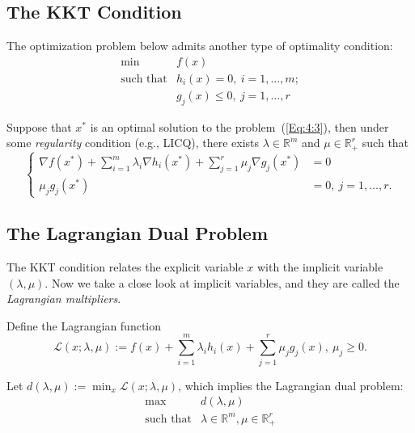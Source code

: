\subsection{The KKT Condition}
The optimization problem below admits another type of optimality condition:
\begin{equation}\label{Eq:4:3}
\begin{array}{ll}
\min&f(x)\\
\mbox{such that}&h_i(x) = 0,\ i=1,\dots,m;\\
&g_j(x) \le0,\ j=1,\dots,r
\end{array}
\end{equation}
\begin{theorem}
Suppose that $x^*$ is an optimal solution to the problem~(\ref{Eq:4:3}), then under some \emph{regularity} condition (e.g., LICQ), there exists $\lambda\in\mathbb{R}^m$ and $\mu\in\mathbb{R}^r_+$ such that
\[
\left\{
\begin{aligned}
\nabla f(x^*)+\sum_{i=1}^m\lambda_i\nabla h_i(x^*)+\sum_{j=1}^r\mu_j\nabla g_j(x^*)&=0\\
\mu_jg_j(x^*)&=0,\ j=1,\dots,r.
\end{aligned}
\right.
\]
\end{theorem}

\subsection{The Lagrangian Dual Problem}
The KKT condition relates the explicit variable $x$ with the implicit variable $(\lambda,\mu)$. Now we take a close look at implicit variables, and they are called the \emph{Lagrangian multipliers}.

Define the Lagrangian function
\[
\mathcal{L}(x;\lambda,\mu):=f(x)+\sum_{i=1}^m\lambda_ih_i(x)+\sum_{j=1}^r\mu_jg_j(x),\ 
\mu_j\ge0.
\]

Let $d(\lambda,\mu) :=\min_{x}\mathcal{L}(x;\lambda,\mu)$, which implies the Lagrangian dual problem:
\begin{equation}\label{Eq:4:4}
\begin{array}{ll}
\max&d(\lambda,\mu)\\
\mbox{such that}&\lambda\in\mathbb{R}^m,\mu\in\mathbb{R}^r_+
\end{array}
\end{equation}

